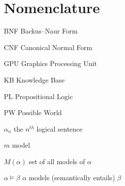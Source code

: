 \chapter{Nomenclature}

\begin{Nomencl}
	\item[BNF] Backus–Naur Form  
	\item[CNF] Canonical Normal Form  
	\item[GPU] Graphics Processing Unit    
    \item[KB] Knowledge Base
    \item[PL] Propositional Logic
    \item[PW] Possible World
    
   
   \item[$\alpha_n$]  the $n^{th}$ logical sentence
   \item[$m$]  model
   \item[$M(\alpha)$]  set of all models of $\alpha$
   \item[$\alpha \models \beta$]  $\alpha$ models (semantically entails) $\beta$

\end{Nomencl}


\endinput
